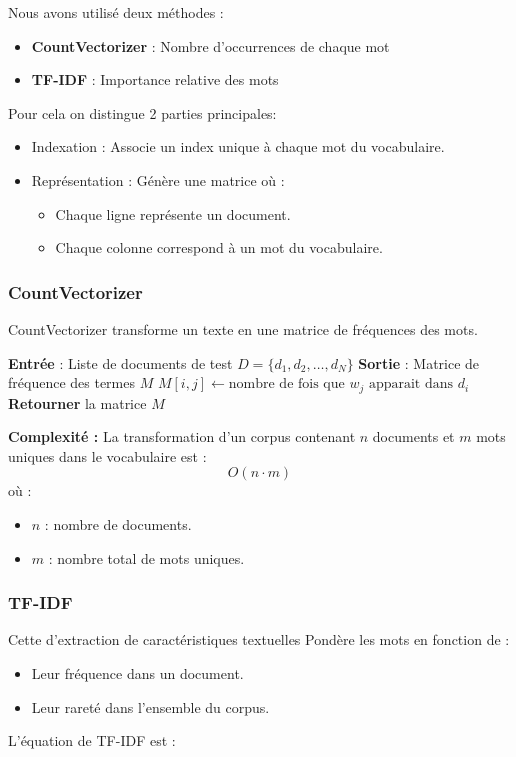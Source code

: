 Nous avons utilisé deux méthodes :
\begin{itemize}
    \item \textbf{CountVectorizer} : Nombre d’occurrences de chaque mot
    \item \textbf{TF-IDF} : Importance relative des mots
\end{itemize}
Pour cela on distingue 2 parties principales:
\begin{itemize}
    \item[•] {Indexation} : Associe un index unique à chaque mot du vocabulaire.
    \item[•] {Représentation} : Génère une matrice où :
    \begin{itemize}
        \item[] Chaque ligne représente un document.
        \item[] Chaque colonne correspond à un mot du vocabulaire.
    \end{itemize}
\end{itemize}
\subsubsection{CountVectorizer}
CountVectorizer transforme un texte en une matrice de fréquences des mots.
\begin{algorithm}[H]
\caption{CountVectorizer}
\begin{algorithmic}[1]
\State \textbf{Entrée} : Liste de documents de test $D = \{d_1, d_2, \dots, d_N\}$
\State \textbf{Sortie} : Matrice de fréquence des termes $M$
        \State $M[i,j] \gets \text{nombre de fois que } w_j \text{ apparait dans } d_i$
    \EndFor
\EndFor
\State \textbf{Retourner} la matrice $M$
\end{algorithmic}
\end{algorithm}
\textbf{Complexité :}  
La transformation d’un corpus contenant \( n \) documents et \( m \) mots uniques dans le vocabulaire est :
\begin{equation}
O(n \cdot m)
\end{equation}
où :
\begin{itemize}
    \item \( n \) : nombre de documents.
    \item \( m \) : nombre total de mots uniques.
\end{itemize}

\subsubsection{TF-IDF}
Cette d’extraction de caractéristiques textuelles Pondère les mots en fonction de :
    \begin{itemize}
        \item[-] Leur fréquence dans un document.
        \item[-] Leur rareté dans l’ensemble du corpus.
    \end{itemize}
L’équation de TF-IDF est :

